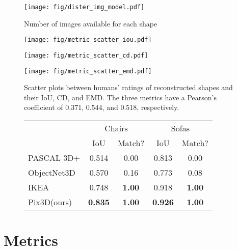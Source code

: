 \documentclass[10pt,twocolumn,letterpaper]{article}
\newcommand{\data}{Pix3D\xspace}
\begin{document}
\begin{figure}[t]
\centering
\texttt{[image: fig/dister\_img\_model.pdf]}
\vspace{-20pt}
\caption{Number of images available for each shape}
\vspace{-15pt}
\label{fig:distr_num}
\end{figure}

 \begin{figure*}[t]
\begin{minipage}[c]{0.33\linewidth}
    \centering
    \texttt{[image: fig/metric\_scatter\_iou.pdf]}
\end{minipage}
\begin{minipage}[c]{0.33\linewidth}
    \centering
    \texttt{[image: fig/metric\_scatter\_cd.pdf]}
\end{minipage}
\begin{minipage}[c]{0.33\linewidth}
    \centering
    \texttt{[image: fig/metric\_scatter\_emd.pdf]}
\end{minipage}
\vspace{-5pt}
\caption{Scatter plots between humans' ratings of reconstructed shapes and their IoU, CD, and EMD. The three metrics have a Pearson's coefficient of 0.371, 0.544, and 0.518, respectively.} 
\label{fig:metric_scatter}
\vspace{-10pt}
\end{figure*} \begin{figure}[t]
 	\centering
    \begin{tabular}{lcccc}
    \toprule
     & \multicolumn{2}{c}{Chairs} & \multicolumn{2}{c}{Sofas} \\
    \cmidrule(lr){2-3}\cmidrule(lr){4-5}
     & IoU & Match? & IoU & Match? \\
    \midrule
     PASCAL 3D+ \cite{Xiang2014PASCAL:} & 0.514 & 0.00 & 0.813 & 0.00 \\
     ObjectNet3D \cite{Xiang2016Objectnet3d:} & 0.570 & 0.16 & 0.773 & 0.08 \\
     IKEA \cite{Lim2013Parsing} & 0.748 & \textbf{1.00} & 0.918 & \textbf{1.00} \\
     \data (ours) & \textbf{0.835} & \textbf{1.00} & \textbf{0.926} & \textbf{1.00} \\
    \bottomrule
    \end{tabular}
    \label{tbl:analy_iou}
    \vspace{-15pt}
\end{figure}  \section{Metrics}
\label{sec:metric}
\end{document}
